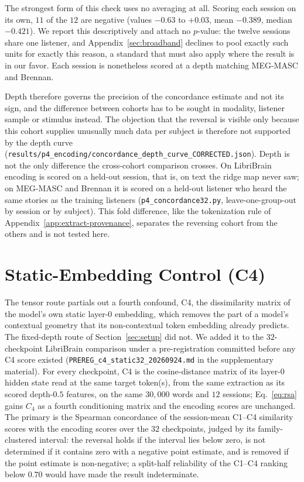 \documentclass{article}
\newcounter{none}
\begin{document}
The strongest form of this check uses no averaging at all. Scoring each session on its own, $11$ of
the $12$ are negative (values $-0.63$ to $+0.03$, mean $-0.389$, median $-0.421$). We report this
descriptively and attach no $p$-value: the twelve sessions share one listener, and
Appendix~\ref{sec:broadband} declines to pool exactly such units for exactly this reason, a standard that must also apply where
the result is in our favor. Each session is nonetheless scored at a depth matching MEG-MASC and
Brennan.

Depth therefore governs the precision of the concordance estimate and not its sign, and the
difference between cohorts has to be sought in modality, listener sample or stimulus instead. The
objection that the reversal is visible only because this cohort supplies unusually much data per
subject is therefore not supported by the depth curve
(\texttt{results/p4\_encoding/\allowbreak concordance\_depth\_curve\_CORRECTED.json}).
Depth is not the only difference the cross-cohort comparison crosses. On LibriBrain encoding is
scored on a held-out session, that is, on text the ridge map never saw; on MEG-MASC and Brennan it
is scored on a held-out listener who heard the same stories as the training listeners
(\texttt{p4\_concordance32.py}, leave-one-group-out by session or by subject). This fold
difference, like the tokenization rule of Appendix~\ref{app:extract-provenance}, separates the
reversing cohort from the others and is not tested here.

\section{Static-Embedding Control (C4)}\label{app:c4}

The tensor route partials out a fourth confound, C4, the dissimilarity matrix of the model's own
static layer-0 embedding, which removes the part of a model's contextual geometry that its
non-contextual token embedding already predicts. The fixed-depth route of
Section~\ref{sec:setup} did not. We added it to the $32$-checkpoint LibriBrain comparison under a
pre-registration committed before any C4 score existed (\texttt{PREREG\_c4\_static32\_20260924.md}
in the supplementary material). For every checkpoint, C4 is the cosine-distance matrix of its
layer-0 hidden state read at the same target token(s), from the same extraction as its scored
depth-$0.5$ features, on the same $30{,}000$ words and $12$ sessions; Eq.~\eqref{eq:rsa} gains
$C_4$ as a fourth conditioning matrix and the encoding scores are unchanged. The primary is the
Spearman concordance of the session-mean C1--C4 similarity scores with the encoding scores over
the $32$ checkpoints, judged by its family-clustered interval: the reversal holds if the interval
lies below zero, is not determined if it contains zero with a negative point estimate, and is
removed if the point estimate is non-negative; a split-half reliability of the C1--C4 ranking
below $0.70$ would have made the result indeterminate.
\end{document}
